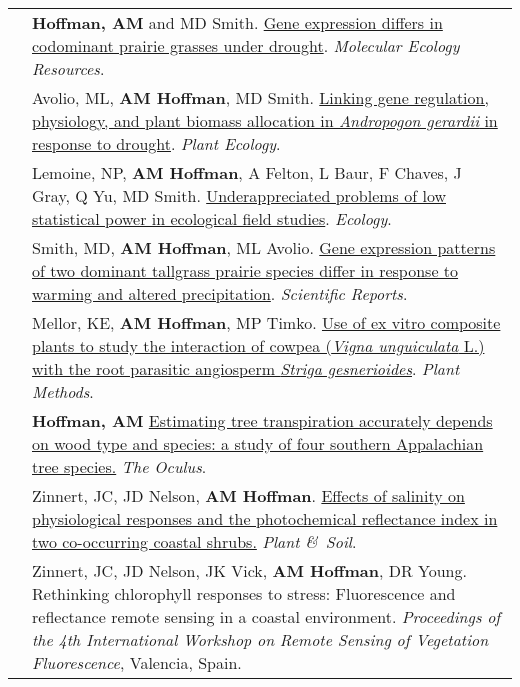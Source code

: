 \documentclass[letterpaper]{deedy-resume} %
\begin{document}
\begin{tabular}{>{\raggedleft\arraybackslash}p{2cm}p{16cm}}
2017 & \textbf{Hoffman, AM} and MD Smith. \href{http://onlinelibrary.wiley.com/doi/10.1111/1755-0998.12733/full}{Gene expression differs in codominant prairie grasses under drought}. \textcolor{special}{\textit{Molecular Ecology Resources}}.\\

2017 & Avolio, ML, \textbf{AM Hoffman}, MD Smith. \href{https://link.springer.com/article/10.1007/s11258-017-0773-3}{Linking gene regulation, physiology, and plant biomass allocation in \textit{Andropogon gerardii} in response to drought}. \textcolor{special}{\textit{Plant Ecology}}. \\

2016 & Lemoine, NP, \textbf{AM Hoffman}, A Felton, L Baur, F Chaves, J Gray, Q Yu, MD Smith. \href{http://onlinelibrary.wiley.com/doi/10.1002/ecy.1506/full}{Underappreciated problems of low statistical power in ecological field studies}. \textcolor{special}{\textit{Ecology}}. \\

2016 & Smith, MD, \textbf{AM Hoffman}, ML Avolio. \href{http://www.nature.com/articles/srep25522}{Gene expression patterns of two dominant tallgrass prairie species differ in response to warming and altered precipitation}. \textcolor{special}{\textit{Scientific Reports}}.\\

2012 & Mellor, KE, \textbf{AM Hoffman}, MP Timko. \href{http://www.plantmethods.com/content/pdf/1746-4811-8-22.pdf}{Use of ex vitro composite plants to study the interaction of cowpea (\textit{Vigna unguiculata} L.) with the root parasitic angiosperm \textit{Striga gesnerioides}}. \textcolor{special}{\textit{Plant Methods}}. \\

2012 & \textbf{Hoffman, AM} \href{http://issuu.com/theoculus/docs/spring2012/}{Estimating tree transpiration accurately depends on wood type and species: a study of four southern Appalachian tree species.} \textcolor{special}{\textit{The Oculus}}.\\

2011 & Zinnert, JC, JD Nelson, \textbf{AM Hoffman}. \href{http://link.springer.com/article/10.1007\%2Fs11104-011-0955-z}{Effects of salinity on physiological responses and the photochemical reflectance index in two co-occurring coastal shrubs.} \textcolor{special}{\textit{Plant \&\ Soil}}. \\

2010 & Zinnert, JC, JD Nelson, JK Vick, \textbf{AM Hoffman}, DR Young. Rethinking chlorophyll responses to stress:  Fluorescence and reflectance remote sensing in a coastal environment.  \textit{Proceedings of the 4th International Workshop on Remote Sensing of Vegetation Fluorescence}, Valencia, Spain.\\


\end{tabular}
\end{document}
